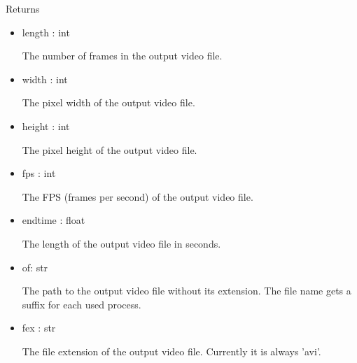 \documentclass[9pt]{extarticle}
\begin{document}
\indent Returns
\begin{itemize}
\item length : int

The number of frames in the output video file.

\item width : int

The pixel width of the output video file. 

\item height : int

The pixel height of the output video file. 

\item fps : int

The FPS (frames per second) of the output video file.

\item endtime : float

The length of the output video file in seconds.

\item of: str

The path to the output video file without its extension.
The file name gets a suffix for each used process.

\item fex : str

The file extension of the output video file.
Currently it is always 'avi'.
\end{itemize}
\end{document}
